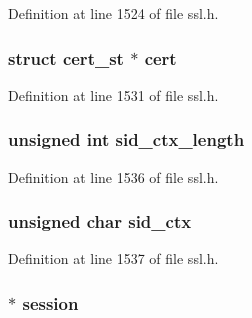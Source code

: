 Definition at line 1524 of file ssl.\+h.

\subsubsection[{\texorpdfstring{cert}{cert}}]{\setlength{\rightskip}{0pt plus 5cm}struct {\bf cert\+\_\+st} $\ast$ cert}\hypertarget{structssl__st_abeb15d9b044d05f1c6506ce64ff9f187}{}\label{structssl__st_abeb15d9b044d05f1c6506ce64ff9f187}


Definition at line 1531 of file ssl.\+h.

\subsubsection[{\texorpdfstring{sid\+\_\+ctx\+\_\+length}{sid_ctx_length}}]{\setlength{\rightskip}{0pt plus 5cm}unsigned int sid\+\_\+ctx\+\_\+length}\hypertarget{structssl__st_a924f0b0c8d0e6c35bac8a124589df9c2}{}\label{structssl__st_a924f0b0c8d0e6c35bac8a124589df9c2}


Definition at line 1536 of file ssl.\+h.

\subsubsection[{\texorpdfstring{sid\+\_\+ctx}{sid_ctx}}]{\setlength{\rightskip}{0pt plus 5cm}unsigned char sid\+\_\+ctx}\hypertarget{structssl__st_a26dc95db49d98798375078f7c1653ba4}{}\label{structssl__st_a26dc95db49d98798375078f7c1653ba4}


Definition at line 1537 of file ssl.\+h.

\subsubsection[{\texorpdfstring{session}{session}}]{ $\ast$ session}\hypertarget{structssl__st_a256a14c1af5a5311e78f1037d7ee2274}{}\label{structssl__st_a256a14c1af5a5311e78f1037d7ee2274}


